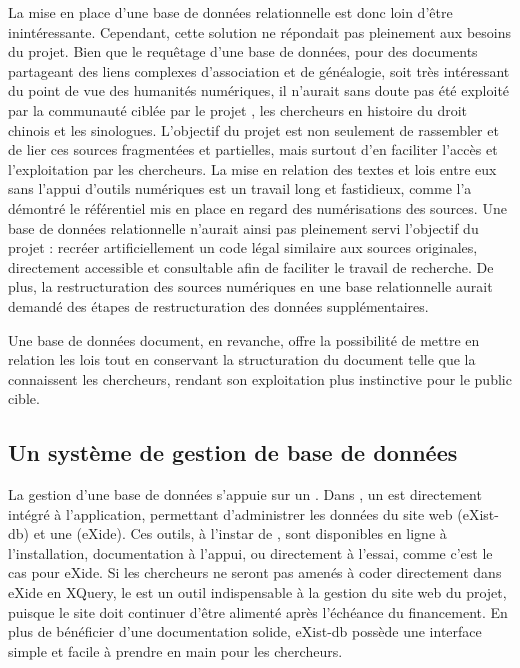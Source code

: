 La mise en place d'une base de données relationnelle est donc loin d'être inintéressante. Cependant, cette solution ne répondait pas pleinement aux besoins du projet. Bien que le requêtage d'une base de données, pour des documents partageant des liens complexes d'association et de généalogie, soit très intéressant du point de vue des humanités numériques, il n'aurait sans doute pas été exploité par la communauté ciblée par le projet \COREL, les chercheurs en histoire du droit chinois et les sinologues. L'objectif du projet est non seulement de rassembler et de lier ces sources fragmentées et partielles, mais surtout d'en faciliter l'accès et l'exploitation par les chercheurs. La mise en relation des textes et lois entre eux sans l'appui d'outils numériques est un travail long et fastidieux, comme l'a démontré le référentiel mis en place en regard des numérisations des sources. Une base de données relationnelle n'aurait ainsi pas pleinement servi l'objectif du projet : recréer artificiellement un code légal similaire aux sources originales, directement accessible et consultable afin de faciliter le travail de recherche. De plus, la restructuration des sources numériques en une base relationnelle aurait demandé des étapes de restructuration des données supplémentaires. 

Une base de données document, en revanche, offre la possibilité de mettre en relation les lois tout en conservant la structuration du document telle que la connaissent les chercheurs, rendant son exploitation plus instinctive pour le public cible. 

\subsection{Un système de gestion de base de données}

La gestion d'une base de données s'appuie sur un \SGBD. Dans \tp, un \SGBD est directement intégré à l'application, permettant d'administrer les données du site web (eXist-db) et une \IDE (eXide). Ces outils, à l'instar de \tp, sont disponibles en ligne à l'installation, documentation à l'appui, ou directement à l'essai, comme c'est le cas pour eXide. Si les chercheurs ne seront pas amenés à coder directement dans eXide en XQuery, le \SGBD est un outil indispensable à la gestion du site web du projet, puisque le site doit continuer d'être alimenté après l'échéance du financement. En plus de bénéficier d'une documentation solide, eXist-db possède une interface simple et facile à prendre en main pour les chercheurs.

